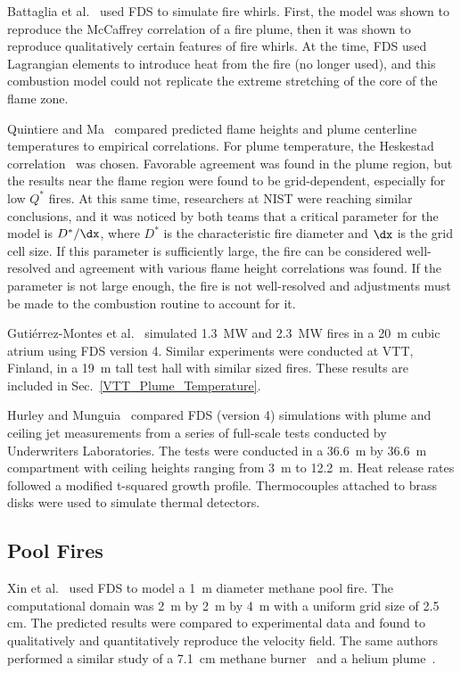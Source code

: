 Battaglia et al.~\cite{Battaglia:1} used FDS to simulate fire whirls.  First, the model was shown to reproduce the McCaffrey correlation of a fire plume,  then it was shown to reproduce qualitatively certain features of fire whirls. At the time, FDS used Lagrangian elements to introduce heat from the fire (no longer used), and this combustion model could not replicate the extreme stretching of the core of the flame zone.

Quintiere and Ma~\cite{Ma:2,Ma:3} compared predicted flame heights and plume centerline temperatures to empirical correlations.  For plume temperature,  the Heskestad  correlation~\cite{SFPE:Heskestad} was chosen. Favorable agreement was found in the plume region, but the results near the flame region were found to be grid-dependent, especially for low $Q^*$ fires. At this same time, researchers at NIST were reaching similar conclusions, and it was noticed by both teams that a critical parameter for the model is $D^*/\dx$, where $D^*$ is the characteristic fire diameter and $\dx$ is the grid cell size. If this parameter is sufficiently large, the fire can be considered well-resolved and agreement with various flame height correlations was found. If the parameter is not large enough, the fire is not well-resolved and adjustments must be made to the combustion routine to account for it.

Guti\'{e}rrez-Montes et al.~\cite{Gutierrez:Building_and_Environment} simulated 1.3~MW and 2.3~MW fires in a 20~m cubic atrium using FDS version 4. Similar experiments were conducted at VTT, Finland, in a 19~m tall test hall with similar sized fires. These results are included in Sec.~\ref{VTT_Plume_Temperature}.

Hurley and Munguia~\cite{Hurley:GCR09-921,Hurley:JFPE2009} compared FDS (version 4) simulations with plume and ceiling jet measurements from a series of full-scale tests conducted by Underwriters Laboratories. The tests were conducted in a 36.6~m by 36.6~m compartment with ceiling heights ranging from 3~m to 12.2~m. Heat release rates followed a modified t-squared growth profile. Thermocouples attached to brass disks were used to simulate thermal detectors.


\subsection{Pool Fires}

Xin et al.~\cite{Xin:JSS2005} used FDS to model a 1~m diameter methane pool fire. The computational domain was 2~m by 2~m by 4~m with a uniform grid size of 2.5 cm. The predicted results were compared to  experimental data and found  to qualitatively and quantitatively reproduce  the velocity field.  The same authors performed a similar study of a 7.1~cm methane burner~\cite{Xin:CF2005} and a helium plume~\cite{Xin:CS2002}.

